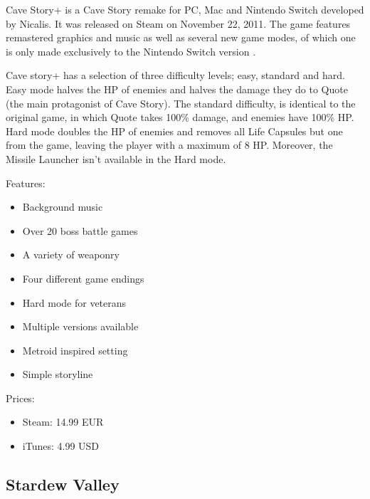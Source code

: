 \documentclass[12p]{article}
\begin{document}
Cave Story+ is a Cave Story remake for PC, Mac and Nintendo Switch developed by Nicalis. It was released on Steam on November 22, 2011. The game features remastered graphics and music as well as several new game modes, of which one is only made exclusively to the Nintendo Switch version \cite{CaveStoryPlusWiki}.

Cave story+ has a selection of three difficulty levels; easy, standard and hard. Easy mode halves the HP of enemies and halves the damage they do to Quote (the main protagonist of Cave Story). The standard difficulty, is identical to the original game, in which Quote takes 100\% damage, and enemies have 100\% HP. Hard mode doubles the HP of enemies and removes all Life Capsules but one from the game, leaving the player with a maximum of 8 HP. Moreover, the Missile Launcher isn't available in the Hard mode.

Features:

\begin{itemize}
  \item Background music
  \item Over 20 boss battle games
  \item A variety of weaponry
  \item Four different game endings
  \item Hard mode for veterans
  \item Multiple versions available
  \item Metroid inspired setting
  \item Simple storyline
\end{itemize}

Prices:

\begin{itemize}
  \item Steam: 14.99 EUR
  \item iTunes: 4.99 USD
\end{itemize}


\subsection{Stardew Valley}
\end{document}
